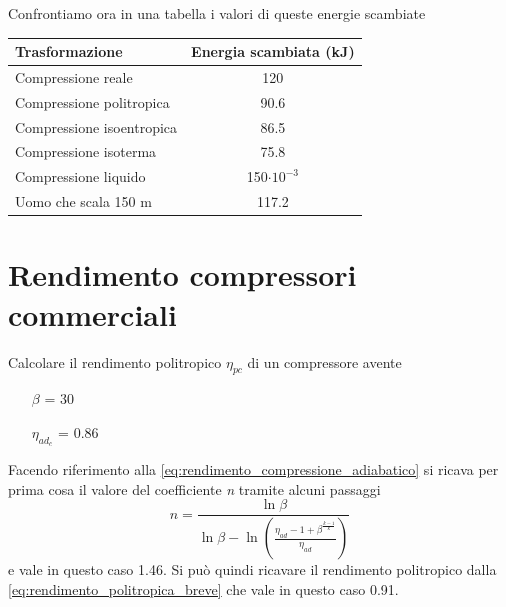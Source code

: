 \documentclass[a4paper,12pt]{article}
\begin{document}
Confrontiamo ora in una tabella i valori di queste energie scambiate
\begin{center}
    \begin{tabular}{l|c}
        Trasformazione & Energia scambiata (kJ)\\ \hline
        Compressione reale        & 120  \\
        Compressione politropica  & 90.6 \\
        Compressione isoentropica & 86.5 \\
        Compressione isoterma     & 75.8 \\
        Compressione liquido      & 150$\cdot 10^{-3}$  \\
        Uomo che scala 150 m      & 117.2
    \end{tabular}
\end{center}

\section{Rendimento compressori commerciali}
Calcolare il rendimento politropico $\eta_{pc}$ di un compressore avente
\begin{itemize}
    \item[$\beta$] = 30
    \item[$\eta_{ad_c}$] = 0.86
\end{itemize}
Facendo riferimento alla \eqref{eq:rendimento_compressione_adiabatico} si ricava per prima cosa il valore
del coefficiente \textit{n} tramite alcuni passaggi
\begin{equation}
    n = \frac{\ln\beta}{\ln\beta - \ln\left(\frac{\eta_{ad}-1+\beta^{\frac{k-1}{k}}}{\eta_{ad}}\right)}
\end{equation}
e vale in questo caso 1.46.
Si può quindi ricavare il rendimento politropico dalla \eqref{eq:rendimento_politropica_breve} che vale in questo caso 0.91.
\end{document}
